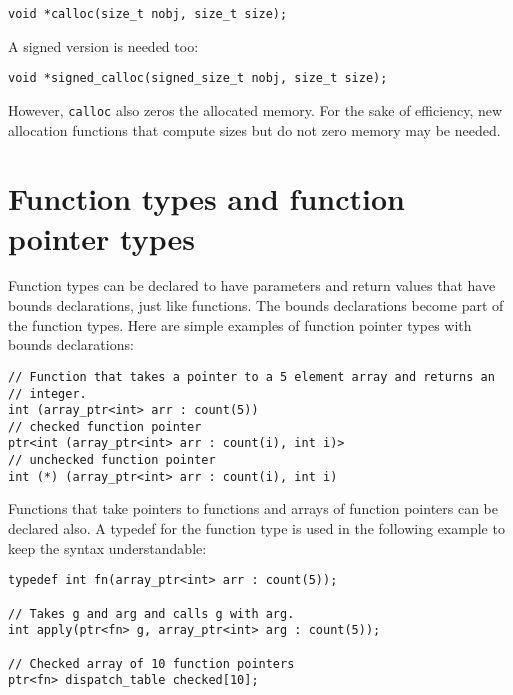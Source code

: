 \begin{lstlisting}
void *calloc(size_t nobj, size_t size);
\end{lstlisting}

A signed version is needed too:
\begin{lstlisting}
void *signed_calloc(signed_size_t nobj, size_t size);
\end{lstlisting}
However, \texttt{calloc} also zeros the allocated memory.  For the sake of efficiency,
new allocation functions that compute sizes but do not zero memory may be needed.

\section{Function types and function pointer types}
\label{section:function-types}

Function types can be declared to have parameters and return values that have bounds
declarations, just like functions.  The bounds declarations become part of the function types.
Here are simple examples of function pointer types with bounds declarations:
\begin{lstlisting}
// Function that takes a pointer to a 5 element array and returns an 
// integer.
int (array_ptr<int> arr : count(5))
// checked function pointer
ptr<int (array_ptr<int> arr : count(i), int i)>
// unchecked function pointer
int (*) (array_ptr<int> arr : count(i), int i)
\end{lstlisting}
Functions that take pointers to functions and arrays of function pointers can
be declared also.  A typedef for the function type is used in the following example
to keep the syntax understandable:
\begin{lstlisting}
typedef int fn(array_ptr<int> arr : count(5));

// Takes g and arg and calls g with arg.
int apply(ptr<fn> g, array_ptr<int> arg : count(5));

// Checked array of 10 function pointers
ptr<fn> dispatch_table checked[10];
\end{lstlisting}

